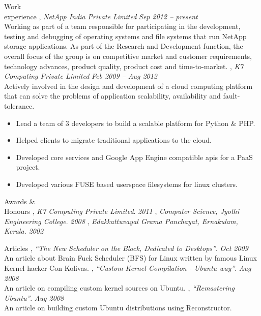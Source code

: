 \documentclass{resume}
\begin{document}
\begin{category}{Work \\experience}
, {\em NetApp India Private Limited} \hfill {\em Sep 2012 -- present}\\
Working as part of a team responsible for participating in the development, testing and 
debugging of operating systems and file systems that run NetApp storage applications. 
As part of the Research and Development function, the overall focus of the group is on 
competitive market and customer requirements, technology advances, product quality, 
product cost and time-to-market.
, {\em K7 Computing Private Limited} \hfill {\em Feb 2009 -- Aug 2012}\\
Actively involved in the design and development of a cloud computing platform that can solve 
the problems of application scalability, availability and fault-tolerance.
\begin{itemize} 
\item Lead a team of 3 developers to build a scalable platform for Python \& PHP.
\item Helped clients to migrate traditional applications to the cloud.
\item Developed core services and Google App Engine compatible apis for a PaaS project.
\item Developed various FUSE based userspace filesystems for linux clusters.
\end{itemize}
\end{category}


\begin{category}{Awards \&\\ Honours}
, {\em K7 Computing Private Limited}. \hfill {\em 2011}
, {\em Computer Science, Jyothi Engineering College}. \hfill {\em 2008}
, {\em Edakkattuvayal Grama Panchayat, Ernakulam, Kerala.} \hfill {\em 2002}
\end{category}


\begin{category}{Articles}
, {\em ``The New Scheduler on the Block, Dedicated to Desktops''}. \hfill {\em Oct 2009}\\
An article about Brain Fuck Scheduler (BFS) for Linux written by famous Linux Kernel hacker Con Kolivas.
, {\em ``Custom Kernel Compilation - Ubuntu way''}. \hfill {\em Aug 2008}\\
An article on compiling custom kernel sources on Ubuntu.
, {\em ``Remastering Ubuntu''}. \hfill {\em Aug 2008}\\
An article on building custom Ubuntu distributions using Reconstructor.
\end{category}
\end{document}
